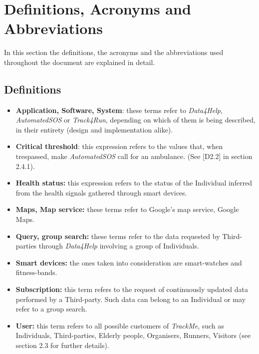 \section{Definitions, Acronyms and Abbreviations}
    In this section the definitions, the acronyms and the abbreviations used throughout the document are explained in detail.
    
    \subsection{Definitions}
        \begin{itemize}
            \item \textbf{Application, Software, System}: these terms refer to \emph{Data4Help}, \emph{AutomatedSOS} or \emph{Track4Run}, depending on which of them is being described, in their entirety (design and implementation alike).
            
            \item \textbf{Critical threshold}: this expression refers to the values that, when trespassed, make \emph{AutomatedSOS} call for an ambulance. (See [D2.2] in section 2.4.1). 
            
            \item \textbf{Health status:} this expression refers to the status of the Individual inferred from the health signals gathered through smart devices.
            
            \item \textbf{Maps, Map service:} these terms refer to Google's map service, Google Maps.
            
            \item \textbf{Query, group search:} these terms refer to the data requested by Third-parties through \emph{Data4Help} involving a group of Individuals.
            
            \item \textbf{Smart devices:} the ones taken into consideration are smart-watches and fitness-bands.
            
            \item \textbf{Subscription:} this term refers to the request of continuously updated data performed by a Third-party. Such data can belong to an Individual or may refer to a group search.
                        
            \item \textbf{User:} this term refers to all possible customers of \emph{TrackMe}, such as Individuals, Third-parties, Elderly people, Organisers, Runners, Visitors (see section 2.3 for further details).
        \end{itemize}
        
